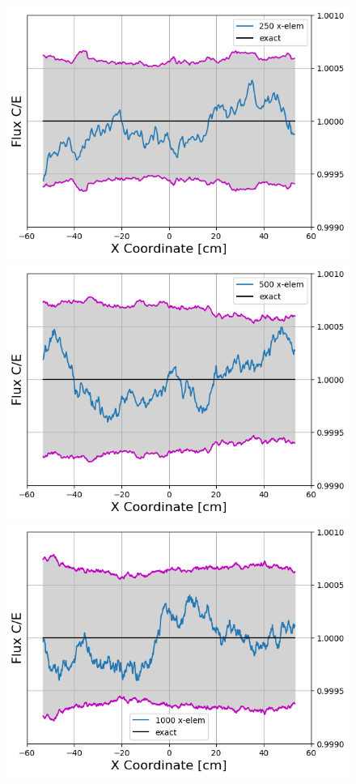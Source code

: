 \documentclass[letterpaper]{mc2023}
\begin{document}
\begin{figure}[H]
\begin{minipage}[b]{0.49\linewidth}
        \includegraphics[width=\linewidth]{figures/250_flux_CE_error_bars}
    \end{minipage}
    \begin{minipage}[b]{0.49\linewidth}
        \includegraphics[width=\linewidth]{figures/500_flux_CE_error_bars}
    \end{minipage}
    \begin{minipage}[b]{0.49\linewidth}
        \includegraphics[width=\linewidth]{figures/1000_flux_CE_error_bars}

\end{minipage}
\end{figure}
\end{document}
